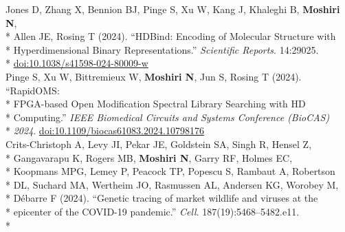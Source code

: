 \documentclass[margin,line]{res}
\begin{document}
\begin{resume}
\hspace*{4mm} Jones D, Zhang X, Bennion BJ, Pinge S, Xu W, Kang J, Khaleghi B, \textbf{Moshiri N},\\*
\hspace*{9.5mm} Allen JE, Rosing T (2024). ``HDBind: Encoding of Molecular Structure with\\*
\hspace*{9.5mm} Hyperdimensional Binary Representations.'' \textit{Scientific Reports}. 14:29025.\\*\vspace{2mm}
\hspace*{8mm} \href{https://doi.org/10.1038/s41598-024-80009-w}{doi:10.1038/s41598-024-80009-w}\\
\hspace*{4mm} Pinge S, Xu W, Bittremieux W, \textbf{Moshiri N}, Jun S, Rosing T (2024). ``RapidOMS:\\*
\hspace*{9.5mm} FPGA-based Open Modification Spectral Library Searching with HD\\*
\hspace*{9.5mm} Computing.'' \textit{IEEE Biomedical Circuits and Systems Conference (BioCAS)}\\*\vspace{2mm}
\hspace*{8mm} \textit{2024}. \href{http://doi.org/10.1109/biocas61083.2024.10798176}{doi:10.1109/biocas61083.2024.10798176}\\
\hspace*{4mm} Crits-Christoph A, Levy JI, Pekar JE, Goldstein SA, Singh R, Hensel Z,\\*
\hspace*{9.5mm} Gangavarapu K, Rogers MB, \textbf{Moshiri N}, Garry RF, Holmes EC,\\*
\hspace*{9.5mm} Koopmans MPG, Lemey P, Peacock TP, Popescu S, Rambaut A, Robertson\\*
\hspace*{9.5mm} DL, Suchard MA, Wertheim JO, Rasmussen AL, Andersen KG, Worobey M,\\*
\hspace*{9.5mm} D\'{e}barre F (2024). ``Genetic tracing of market wildlife and viruses at the\\*
\hspace*{9.5mm} epicenter of the COVID-19 pandemic.'' \textit{Cell}. 187(19):5468--5482.e11.\\*\vspace{2mm}

\end{resume}
\end{document}
